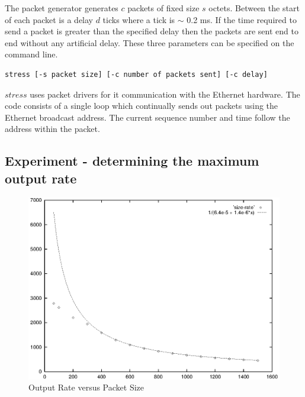 The packet generator generates $c$ packets of fixed size $s$ octets.
Between the start of each packet is a delay $d$ ticks where a tick is
$\sim$ 0.2 ms.  If the time required to send a packet is greater than
the specified delay then the packets are sent end to end without any
artificial delay.  These three parameters can be specified on the
command line.

{\small
\begin{verbatim}
stress [-s packet size] [-c number of packets sent] [-c delay]
\end{verbatim}
}

$stress$ uses packet drivers for it communication with the Ethernet
hardware.  The code consists of a single loop which continually sends
out packets using the Ethernet broadcast address.  The current
sequence number and time follow the address within the packet.


\subsection{Experiment - determining the maximum output rate}

\begin{figure}
\leavevmode
\includegraphics{pics/size-rate-fit.eps}
\caption{Output Rate versus Packet Size}
\label{trace:expr1}
\end{figure}

